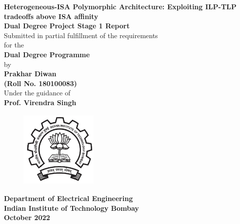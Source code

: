 \documentclass[a4paper,12pt, final]{report}
\begin{document}
  \thispagestyle{empty}
  \vspace*{1cm}
  {\centering     
  \textbf{\LARGE Heterogeneous-ISA Polymorphic Architecture: Exploiting ILP-TLP tradeoffs above ISA affinity}\\
  \vspace{1.20cm}
  \textbf{\large Dual Degree Project Stage 1 Report}\\
  \vspace{1cm}
  {Submitted in partial fulfillment of the requirements}\\
  \vspace{0.25cm}
  {for the}\\
  \vspace{1cm}
  \textbf{Dual Degree Programme}\\
  \vspace{1.50cm}
  {by}\\
  \vspace{0.20cm}
  \textbf{\large Prakhar Diwan}\\
  \vspace{0.25cm}
  \textbf{\large (Roll No. 180100083)}\\
  \vspace{1.8cm}
  {Under the guidance of}\\
  \vspace{0.20cm}
  \textbf{\large Prof. Virendra Singh}\\
    \vspace{0.30cm}
  \vspace{1.450cm}
    \begin{figure}[htb]
    \begin{center}
    \includegraphics[height=1.5in,width=1.5in]{iitblogo.png}
    \end{center}
    \end{figure}

    
  {\textbf{Department of Electrical Engineering}}\\
  {\textbf{Indian Institute of Technology Bombay}}\\
  {\textbf{October 2022}}
 
 }
 
\end{document}
